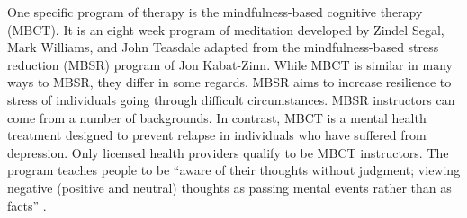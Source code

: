 One specific program of therapy is the mindfulness-based cognitive therapy (MBCT). It is an eight week program of meditation developed by Zindel Segal, Mark Williams, and John Teasdale adapted from the mindfulness-based stress reduction (MBSR) program of Jon Kabat-Zinn. While MBCT is similar in many ways to MBSR, they differ in some regards. MBSR aims to increase resilience to stress of individuals going through difficult circumstances. MBSR instructors can come from a number of backgrounds. In contrast, MBCT is a mental health treatment designed to prevent relapse in individuals who have suffered from depression. Only licensed health providers qualify to be MBCT instructors. The program teaches people to be “aware of their thoughts without judgment; viewing negative (positive and neutral) thoughts as passing mental events rather than as facts” \cite{williams_mindfulness-based_2008}.
  